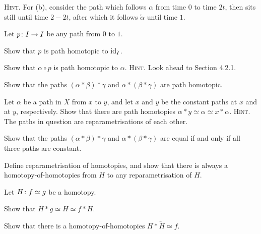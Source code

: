 {\scshape Hint}. For (b), consider the path which follows $\alpha$ from time $0$ to time $2t$, then sits still until time $2-2t$, after which it follows $\overleftarrow{\alpha}$ until time $1$.
\een
\ep

\bs
\ben[label=(\alph*)]
\item 
\item 
\een
\es

\bp
Let $p \colon I \to I$ be any path from $0$ to $1$.
\ben[label=(\alph*)]
\item Show that $p$ is path homotopic to $\mathrm{id}_I$.
\item Show that $\alpha \circ p$ is path homotopic to $\alpha$. 
\een
{\scshape Hint}. Look ahead to Section 4.2.1.
\ep

\bs
\ben[label=(\alph*)]
\item 
\item 
\een
\es

\bp
\ben[label=(\alph*)]
\item Show that the paths $(\alpha * \beta) * \gamma$ and $\alpha * (\beta * \gamma)$ are path homotopic.
\item Let $\alpha$ be a path in $X$ from $x$ to $y$, and let $\boxed{x}$ and $\boxed{y}$ be the constant paths at $x$ and at $y$, respectively. Show that there are path homotopies $\alpha * \boxed{y} \simeq \alpha \simeq \boxed{x} * \alpha$.
\een
{\scshape Hint}. The paths in question are reparametrisations of each other.
\ep

\bs
\ben[label=(\alph*)]
\item 
\item 
\een
\es

\bx
Show that the paths $(\alpha * \beta) * \gamma$ and $\alpha * (\beta * \gamma)$ are equal if and only if all three paths are constant.
\ex

\bs
\es

\bp
Define reparametrisation of homotopies, and show that there is always a homotopy-of-homotopies from $H$ to any reparametrisation of $H$.
\ep

\bs
\es

\bp
Let $H \colon f \simeq g$ be a homotopy.
\ben[label=(\alph*)]
\item Show that $H * \boxed{g} \simeq H \simeq \boxed{f} * H$.
\item Show that there is a homotopy-of-homotopies $H * \overleftarrow{H}\simeq\boxed{f}$.
\een
\ep

\bs
\ben[label=(\alph*)]
\item 
\item 
\een
\es
















